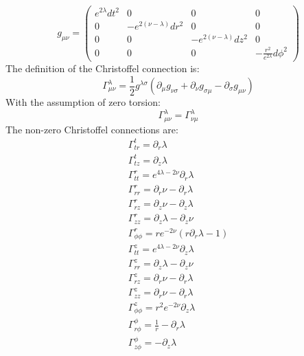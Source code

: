 \documentclass{article}
\begin{document}
\begin{equation}
g_{\mu\nu}=\left(\begin{array}{cccc}
e^{2\lambda}dt^{2} & 0 & 0 & 0\\
0 & -e^{2\left(\nu-\lambda\right)}dr^{2} & 0 & 0\\
0 & 0 & -e^{2\left(\nu-\lambda\right)}dz^{2} & 0\\
0 & 0 & 0 & -\frac{r^{2}}{e^{2\lambda}}d\phi^{2}
\end{array}\right)\label{eq:general-axisymmetric-static-matrix-metric}
\end{equation}
The definition of the Christoffel connection is: \cite{carroll2003spacetime} 
\begin{equation}
\Gamma_{\mu\nu}^{\lambda}=\frac{1}{2}g^{\lambda\sigma}\left(\partial_{\mu}g_{\nu\sigma}+\partial_{\nu}g_{\sigma\mu}-\partial_{\sigma}g_{\mu\nu}\right)
\end{equation}
With the assumption of zero torsion:
\begin{equation}
\Gamma_{\mu\nu}^{\lambda}=\Gamma_{\nu\mu}^{\lambda}
\end{equation}
The non-zero Christoffel connections are:
\begin{equation}
\begin{array}{l}
\Gamma^{t}_{tr}=\partial_{r}\lambda\\
\Gamma^{t}_{tz}=\partial_{z}\lambda\\
\Gamma^{r}_{tt}=e^{4\lambda-2\nu}\partial_{r}\lambda\\
\Gamma^{r}_{rr}=\partial_{r}\nu-\partial_{r}\lambda\\
\Gamma^{r}_{rz}=\partial_{z}\nu-\partial_{z}\lambda\\
\Gamma^{r}_{zz}=\partial_{z}\lambda-\partial_{z}\nu\\
\Gamma^{r}_{\phi\phi}=re^{-2\nu}\left(r\partial_{r}\lambda-1\right)\\
\Gamma^{z}_{tt}=e^{4\lambda-2\nu}\partial_{z}\lambda\\
\Gamma^{z}_{rr}=\partial_{z}\lambda-\partial_{z}\nu\\
\Gamma^{z}_{rz}=\partial_{r}\nu-\partial_{r}\lambda\\ 
\Gamma^{z}_{zz}=\partial_{r}\nu-\partial_{r}\lambda\\
\Gamma^{z}_{\phi\phi}=r^{2}e^{-2\nu}\partial_{z}\lambda\\
\Gamma^{\phi}_{r\phi}=\frac{1}{r}-\partial_{r}\lambda\\
\Gamma^{\phi}_{z\phi}=-\partial_{z}\lambda\\
\end{array}
\end{equation}
\end{document}
